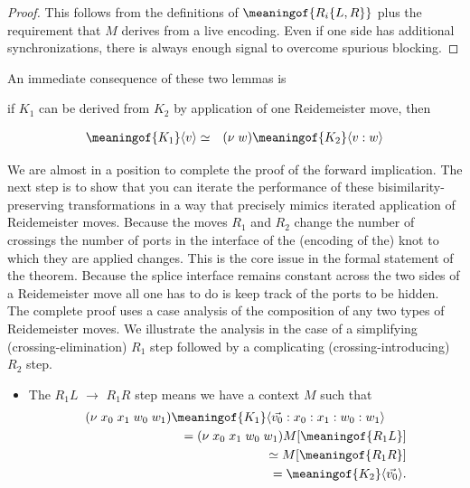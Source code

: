 \begin{proof}
  This follows from the definitions of $\meaningof{R_{i}\{L,R\}}$ plus
  the requirement that $M$ derives from a live encoding. Even if one
  side has additional synchronizations, there is always enough signal
  to overcome spurious blocking.
\end{proof}

An immediate consequence of these two lemmas is 

\begin{lemma}[1-step]
  if $K_{1}$ can be derived from $K_{2}$ by application of one Reidemeister move, then 

  \begin{eqnarray}
    \meaningof{K_{1}}\langle v \rangle & \simeq & (\nu \; w)\meaningof{K_{2}}\langle v:w \rangle \nonumber
  \end{eqnarray}
\end{lemma}

We are almost in a position to complete the proof of the forward
implication. The next step is to show that you can iterate the
performance of these bisimilarity-preserving transformations in a way
that precisely mimics iterated application of Reidemeister
moves. Because the moves $R_{1}$ and $R_{2}$ change the number of
crossings the number of ports in the interface of the (encoding of
the) knot to which they are applied changes. This is the core issue in
the formal statement of the theorem. Because the splice interface
remains constant across the two sides of a Reidemeister move all one
has to do is keep track of the ports to be hidden. The complete proof
uses a case analysis of the composition of any two types of
Reidemeister moves. We illustrate the analysis in the case of a
simplifying (crossing-elimination) $R_1$ step followed by a complicating
(crossing-introducing) $R_2$ step.

\begin{itemize}
   \item The $R_{1}L$ $\to$ $R_{1}R$ step means we have a context $M$ such that
     \begin{eqnarray}
       (\nu \; x_0 \; x_1 \; w_0 \; w_1)\lefteqn{\meaningof{K_{1}}\langle \vec{v_0}:x_0 : x_1 : w_0 : w_1\rangle} \nonumber \\
       & & = (\nu \; x_0 \; x_1 \; w_0 \; w_1)M[ \meaningof{R_{1}L} ] \nonumber \\
       & & \simeq M[ \meaningof{R_{1}R} ] \nonumber \\
       & & = \meaningof{K_{2}}\langle \vec{v_0} \rangle. \nonumber
     \end{eqnarray}
   \end{itemize}

